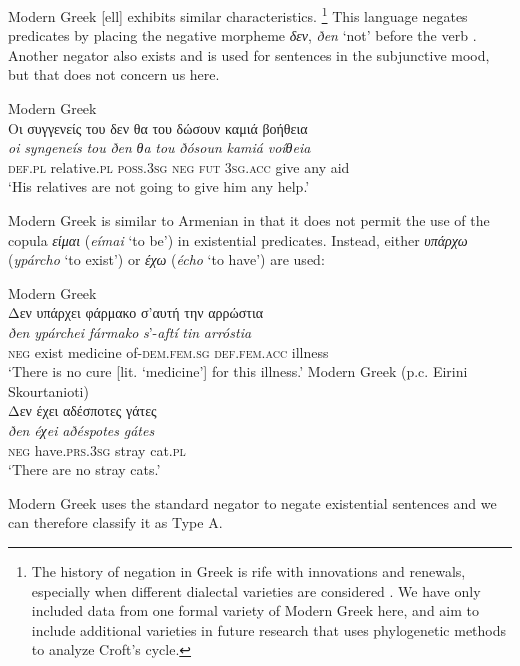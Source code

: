 ﻿\documentclass[output=paper]{langsci/langscibook}
\begin{document}
Modern Greek [ell] exhibits similar characteristics.%
%
\footnote{The history of negation in Greek is rife with innovations and
renewals, especially when different dialectal varieties are considered
\parencite[for example, see][]{KiparskyCondoravdi2006-ieur}. We have only included data from one formal variety of Modern Greek here, and aim to include additional varieties in future research that uses phylogenetic methods to analyze Croft's cycle.} 
%
This language negates predicates by placing the negative morpheme
\textit{δεν}, \textit{ðen} `not' before the verb
\parencite[510]{HoltonMackridge2012}. Another negator also exists and is
used for sentences in the subjunctive mood, but that does not concern us
here. 
%
\begin{exe}\ex
Modern Greek \parencite[510]{HoltonMackridge2012}\\
    \glll Οι συγγενείς του δεν θα του δώσουν καμιά βοήθεια \\
\textit{oi} \textit{syngeneís} \textit{tou} \textit{ðen} \textit{θa} \textit{tou} \textit{ðósoun} \textit{kamiá} \textit{voíθeia} \\
\textsc{def.pl} relative.\textsc{pl} \textsc{poss.3sg} \textsc{neg}
\textsc{fut} \textsc{3sg.acc} give any aid\\
    \glt `His relatives are not going to give him any help.' 
    \end{exe}
%
Modern Greek is similar to Armenian in that it does not permit the use of
the copula \textit{είμαι} (\textit{eímai} `to be') in existential
predicates. Instead, either \textit{υπάρχω} (\textit{ypárcho} `to exist')
or \textit{έχω} (\textit{écho} `to have') are used:
%
\begin{exe}\ex
Modern Greek \parencite[493]{HoltonMackridge2012}\\
    \glll Δεν υπάρχει φάρμακο σ'αυτή την αρρώστια \\
\textit{ðen} \textit{ypárchei} \textit{fármako} \textit{s}’-\textit{aftí} \textit{tin} \textit{arróstia} \\
\textsc{neg} exist medicine of-\textsc{dem.fem.sg} \textsc{def.fem.acc}
illness\\
    \glt
`There is no cure [lit. ‘medicine'] for this illness.' 
\ex
Modern Greek (p.c. Eirini Skourtanioti)\\
    \glll Δεν έχει αδέσποτες γάτες\\
\textit{ðen} \textit{éχei} \textit{aðéspotes} \textit{gátes} \\
\textsc{neg}  have.\textsc{prs.3sg} stray cat.\textsc{pl}\\
    \glt `There are no stray cats.'
    \end{exe}
%
Modern Greek uses the standard negator to negate existential sentences and we can therefore classify it as Type A. 
\end{document}
